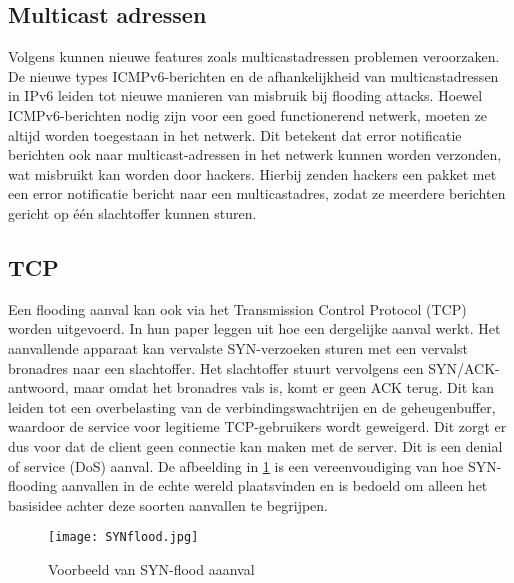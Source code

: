 \subsection{Multicast adressen}    
Volgens \textcite{1619968} kunnen nieuwe features zoals multicastadressen problemen veroorzaken. De nieuwe types ICMPv6-berichten en de afhankelijkheid van multicastadressen in IPv6 leiden tot nieuwe manieren van misbruik bij flooding attacks. Hoewel ICMPv6-berichten nodig zijn voor een goed functionerend netwerk, moeten ze altijd worden toegestaan in het netwerk. \autocite{DURDAGI20105285} Dit betekent dat error notificatie berichten ook naar multicast-adressen in het netwerk kunnen worden verzonden, wat misbruikt kan worden door hackers. Hierbij zenden hackers een pakket met een error notificatie bericht naar een multicastadres, zodat ze meerdere berichten gericht op één slachtoffer kunnen sturen.

\subsection{TCP}
Een flooding aanval kan ook via het Transmission Control Protocol (TCP) worden uitgevoerd. \autocite{gao2014detecting} In hun paper leggen \textcite{gao2014detecting} uit hoe een dergelijke aanval werkt. Het aanvallende apparaat kan vervalste SYN-verzoeken sturen met een vervalst bronadres naar een slachtoffer. Het slachtoffer stuurt vervolgens een SYN/ACK-antwoord, maar omdat het bronadres vals is, komt er geen ACK terug. Dit kan leiden tot een overbelasting van de verbindingswachtrijen en de geheugenbuffer, waardoor de service voor legitieme TCP-gebruikers wordt geweigerd. \autocite{gao2014detecting} Dit zorgt er dus voor dat de client geen connectie kan maken met de server. Dit is een denial of service (DoS) aanval. \autocite{morbitzer2013tcp} De afbeelding in \ref{fig:SYNflood} is een vereenvoudiging van hoe SYN-flooding aanvallen in de echte wereld plaatsvinden en is bedoeld om alleen het basisidee achter deze soorten aanvallen te begrijpen. \autocite{eddy2006defenses}

\begin{figure}[H]
\texttt{[image: SYNflood.jpg]}
\caption{Voorbeeld van SYN-flood aaanval \autocite{eddy2006defenses} }
\label{fig:SYNflood}
\end{figure}  
 
